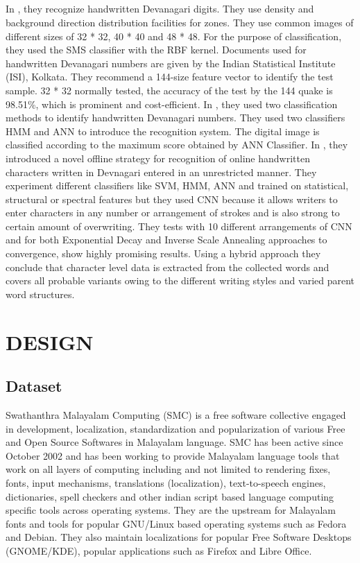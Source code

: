 \documentclass[a4paper,12pt]{report}
\begin{document}
\paragraph{}
In \cite{Jan}, they recognize handwritten Devanagari digits. They use density and background direction distribution facilities for zones. They use common images of different sizes of 32 * 32, 40 * 40 and 48 * 48. For the purpose of classification, they used the SMS classifier with the RBF kernel. Documents used for handwritten Devanagari numbers are given by the Indian Statistical Institute (ISI), Kolkata. They recommend a 144-size feature vector to identify the test sample. 32 * 32 normally tested, the accuracy of the test by the 144 quake is 98.51\%, which is prominent and cost-efficient. In \cite{Bha}, they used two classification methods to identify handwritten Devanagari numbers. They used two classifiers HMM and ANN to introduce the recognition system. The digital image is classified according to the maximum score obtained by ANN Classifier. In \cite{Meh}, they introduced a novel offline strategy for recognition of online handwritten characters written in Devnagari entered in an unrestricted manner. They experiment different classifiers like SVM, HMM, ANN and trained on statistical, structural or spectral features but they used CNN because it allows writers to enter characters in any number or arrangement of strokes and is also strong to certain amount of overwriting. They tests with 10 different arrangements of CNN and for both Exponential Decay and Inverse Scale Annealing approaches to convergence, show highly promising results. Using a hybrid approach they conclude that character level data is extracted from the collected words and covers all probable variants owing to the different writing styles and varied parent word structures.

\newpage
\renewcommand\chaptername{CHAPTER}
\chapter{DESIGN}

\section{Dataset}
Swathanthra Malayalam Computing (SMC) is a free software collective engaged in development, localization, standardization and popularization of various Free and Open Source Softwares in Malayalam language. 
SMC has been active since October 2002 and has been working to provide Malayalam language tools that work on all layers of computing including and not limited to rendering fixes, fonts, input mechanisms, translations (localization), text-to-speech engines, dictionaries, spell checkers and other indian script based language computing specific tools across operating systems. They are the upstream for Malayalam fonts and tools for popular GNU/Linux based operating systems such as Fedora and Debian. They also maintain localizations for popular Free Software Desktops (GNOME/KDE), popular applications such as Firefox and Libre Office.
\end{document}
